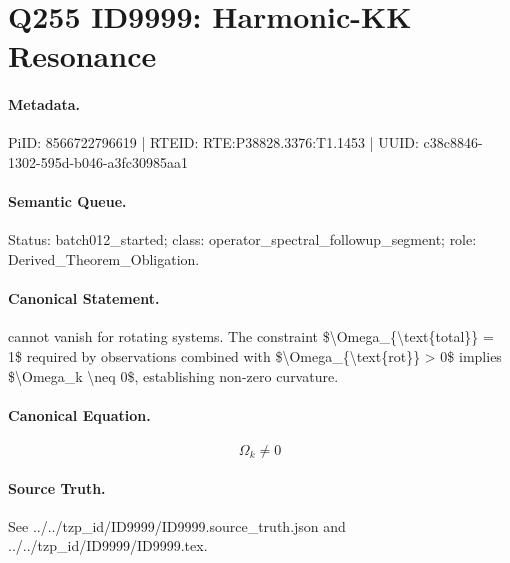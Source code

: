 \section*{Q255 ID9999: Harmonic-KK Resonance}
\paragraph{Metadata.}
PiID: 8566722796619 | RTEID: RTE:P38828.3376:T1.1453 | UUID: c38c8846-1302-595d-b046-a3fc30985aa1

\paragraph{Semantic Queue.}
Status: batch012\_started; class: operator\_spectral\_followup\_segment; role: Derived\_Theorem\_Obligation.

\paragraph{Canonical Statement.}
cannot vanish for rotating systems. The constraint \$\textbackslash{}Omega\_\{\textbackslash{}text\{total\}\} = 1\$ required by observations combined with \$\textbackslash{}Omega\_\{\textbackslash{}text\{rot\}\} > 0\$ implies \$\textbackslash{}Omega\_k \textbackslash{}neq 0\$, establishing non-zero curvature.

\paragraph{Canonical Equation.}
\[
\Omega_k \neq 0
\]

\paragraph{Source Truth.}
See ../../tzp\_id/ID9999/ID9999.source\_truth.json and ../../tzp\_id/ID9999/ID9999.tex.
